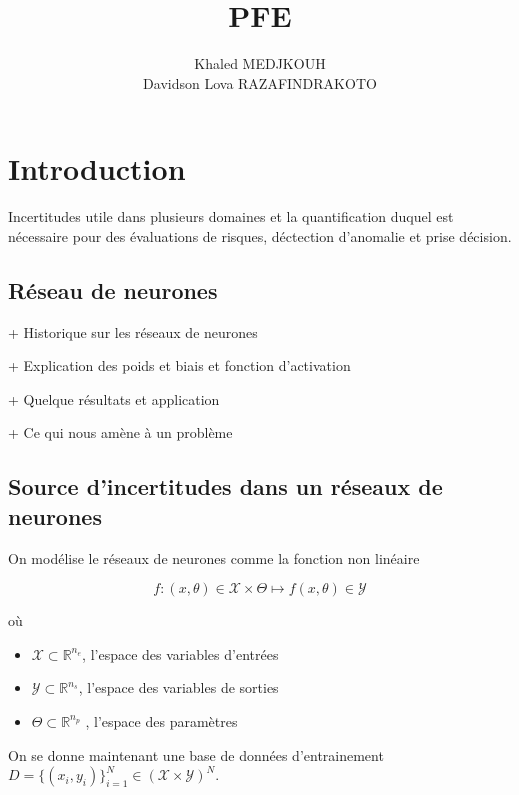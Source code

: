 \documentclass[french,12pt]{article}
\title{PFE}
\author{Khaled MEDJKOUH \\ Davidson Lova RAZAFINDRAKOTO}
\begin{document}
\maketitle

\pagebreak

\tableofcontents

\pagebreak

\section{Introduction}
Incertitudes utile dans plusieurs domaines et la quantification duquel
est nécessaire pour des évaluations de risques, déctection d'anomalie et prise décision.


\subsection{Réseau de neurones}



+ Historique sur les réseaux de neurones

+ Explication des poids et biais et fonction d'activation

+ Quelque résultats et application

+ Ce qui nous amène à un problème



\subsection{Source d'incertitudes dans un réseaux de neurones}

On modélise le réseaux de neurones comme la fonction non linéaire

$$f : (x, \theta) \in \mathcal{X} \times \Theta \mapsto f(x, \theta) \in \mathcal{Y}$$

où

\begin{itemize}
    \item $\mathcal{X} \subset \mathbb{R}^{n_e}$, l'espace des variables d'entrées
    \item $\mathcal{Y} \subset \mathbb{R}^{n_s}$, l'espace des variables de sorties
    \item $\Theta \subset \mathbb{R}^{n_p}$ , l'espace des paramètres
\end{itemize}

On se donne maintenant une base de données d'entrainement
$D = \{ (x_i, y_i)\}_{i = 1}^N \in (\mathcal{X} \times \mathcal{Y})^N$.
\end{document}
